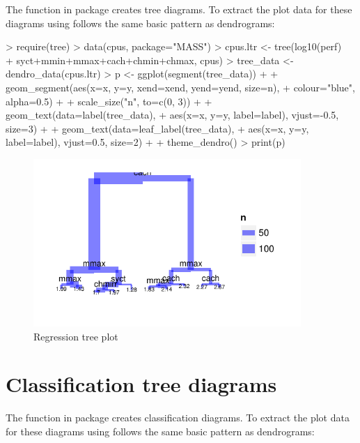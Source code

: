 \documentclass[10pt,oneside]{article}
\begin{document}
The  function in package  creates tree diagrams.  To extract the plot data for these diagrams using \ggdendro{} follows the same basic pattern as dendrograms: 

\begin{Schunk}
\begin{Sinput}
> require(tree)
> data(cpus, package="MASS")
> cpus.ltr <- tree(log10(perf) ~ 
+         syct+mmin+mmax+cach+chmin+chmax, cpus)
> tree_data <- dendro_data(cpus.ltr)
> p <- ggplot(segment(tree_data)) +
+     geom_segment(aes(x=x, y=y, xend=xend, yend=yend, size=n), 
+         colour="blue", alpha=0.5) +
+     scale_size("n", to=c(0, 3)) +
+     geom_text(data=label(tree_data), 
+         aes(x=x, y=y, label=label), vjust=-0.5, size=3) +
+     geom_text(data=leaf_label(tree_data), 
+         aes(x=x, y=y, label=label), vjust=0.5, size=2) +
+     theme_dendro()
> print(p)
\end{Sinput}
\end{Schunk}

\begin{figure}[h]
\begin{center}
\includegraphics[width=4in, height=2.5in]{ggdendro-tree1}
\end{center}
\caption{Regression tree plot}
\end{figure}


\section{Classification tree diagrams}

The  function in package  creates classification diagrams.  To extract the plot data for these diagrams using \ggdendro{} follows the same basic pattern as dendrograms: 

\begin{Schunk}
\end{Schunk}
\end{document}
